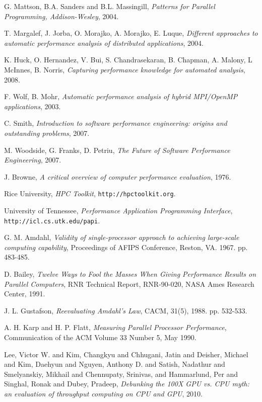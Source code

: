 \documentclass[a4paper]{report}
\begin{document}
\begin{thebibliography}{9}
  G. Mattson, B.A. Sanders and B.L. Massingill, 
  \emph{Patterns for Parallel Programming, Addison-Wesley},
  2004.
  
  T. Margalef, J. Jorba, O. Morajko, A. Morajko, E. Luque,
  \emph{Different approaches to automatic performance analysis of distributed
    applications},
  2004.
  
  K. Huck, O. Hernandez, V. Bui, S. Chandrasekaran, B. Chapman, A. Malony,
  L McInnes, B. Norris,
  \emph{Capturing performance knowledge for automated analysis},
  2008.
  
  F. Wolf, B. Mohr,
  \emph{Automatic performance analysis of hybrid MPI/OpenMP applications},
  2003.
  
  C. Smith,
  \emph{Introduction to software performance engineering: origins and
    outstanding problems},
  2007.

  M. Woodside, G. Franks, D. Petriu,
  \emph{The Future of Software Performance Engineering},
  2007.

  J. Browne,
  \emph{A critical overview of computer performance evaluation},
  1976.

  Rice University,
  \emph{HPC Toolkit}, {\tt http://hpctoolkit.org}.
       
  University of Tennessee,
  \emph{Performance Application Programming Interface},
       {\tt http://icl.cs.utk.edu/papi}.
       
  G. M. Amdahl,
  \emph{Validity of single-processor approach to achieving large-scale
    computing capability},
  Proceedings of AFIPS Conference, Reston, VA. 1967. pp. 483-485.
  
  D. Bailey, \emph{Twelve Ways to Fool the Masses When Giving Performance
    Results on Parallel Computers},
  RNR Technical Report, RNR-90-020, NASA Ames Research Center, 1991.
  
  J. L. Gustafson,
  \emph{Reevaluating Amdahl's Law}, CACM, 31(5), 1988. pp. 532-533.
  
  A. H. Karp and H. P. Flatt,
  \emph{Measuring Parallel Processor Performance},
  Communication of the ACM Volume 33 Number 5, May 1990.
  
  {Lee, Victor W. and Kim, Changkyu and Chhugani, Jatin and Deisher, Michael
    and Kim, Daehyun and Nguyen, Anthony D. and Satish, Nadathur and
    Smelyanskiy, Mikhail and Chennupaty}, Srinivas, and Hammarlund, Per and
  Singhal, Ronak and Dubey, Pradeep,
  \emph{Debunking the 100X GPU vs. CPU myth: an evaluation of throughput
    computing on CPU and GPU},
  2010.
  

\end{thebibliography}
\end{document}
